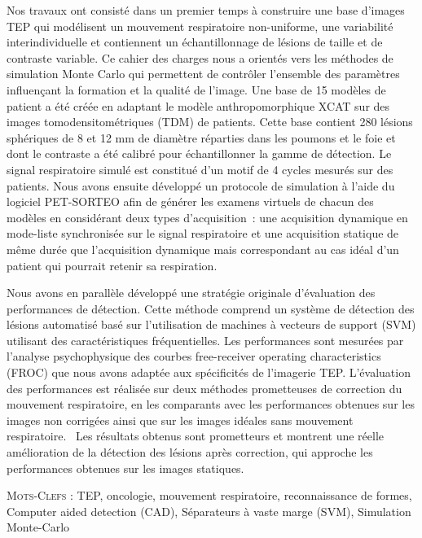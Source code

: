 Nos travaux ont consisté dans un premier temps à construire une base d’images TEP qui modélisent un mouvement respiratoire non-uniforme, une variabilité interindividuelle et contiennent un échantillonnage de lésions de taille et de contraste variable. Ce cahier des charges nous a orientés vers les méthodes de simulation Monte Carlo qui permettent de contrôler l’ensemble des paramètres influençant la formation et la qualité de l’image. Une base de 15 modèles de patient a été créée en adaptant le modèle anthropomorphique XCAT sur des images tomodensitométriques (TDM) de patients. Cette base contient 280 lésions sphériques de 8 et 12 mm de diamètre réparties dans les poumons et le foie et dont le contraste a été calibré pour échantillonner la gamme de détection. Le signal respiratoire simulé est constitué d’un motif de 4 cycles mesurés sur des patients. Nous avons ensuite développé un protocole de simulation à l’aide du logiciel PET-SORTEO afin de générer les examens virtuels de chacun des modèles en considérant deux types d’acquisition : une acquisition dynamique en mode-liste synchronisée sur le signal respiratoire et une acquisition statique de même durée que l’acquisition dynamique mais correspondant au cas idéal d’un patient qui pourrait retenir sa respiration.

Nous avons en parallèle développé une stratégie originale d’évaluation des performances de détection. Cette méthode comprend un système de détection des lésions automatisé basé sur l'utilisation de machines à vecteurs de support (SVM) utilisant des caractéristiques fréquentielles. Les performances sont mesurées par l’analyse psychophysique des courbes free-receiver operating characteristics (FROC) que nous avons adaptée aux spécificités de l’imagerie TEP. L’évaluation des performances est réalisée sur deux méthodes prometteuses de correction du mouvement respiratoire, en les comparants avec les performances obtenues sur les images non corrigées ainsi que sur les images idéales sans mouvement respiratoire. 
Les résultats obtenus sont prometteurs et montrent une réelle amélioration de la détection des lésions après correction, qui approche les performances obtenues sur les images statiques. 

\textsc{Mots-Clefs :} TEP, oncologie, mouvement respiratoire, reconnaissance de formes, Computer aided detection (CAD), Séparateurs à vaste marge (SVM), Simulation Monte-Carlo